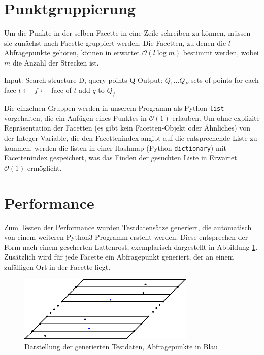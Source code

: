 \documentclass[11pt, a4paper]{article}
\begin{document}
\section{Punktgruppierung}
Um die Punkte in der selben Facette in eine Zeile schreiben zu können, müssen sie zunächst nach Facette gruppiert werden. Die Facetten, zu denen die $l$ Abfragepunkte gehören, können in erwartet $\mathcal{O}(l \log m)$ bestimmt werden, wobei $m$ die Anzahl der Strecken ist.

\begin{algorithmic}[1]
\State Input: Search structure D, query points Q
\State Output: $Q_1 \dots Q_F$ sets of points for each face
		\State $t \gets$ 
		\State $f \gets$ face of $t$
		\State add $q$ to $Q_f$
	\EndFor
\EndFunction
\end{algorithmic}

Die einzelnen Gruppen werden in unserem Programm als Python \texttt{list} vorgehalten, die ein Anfügen eines Punktes in $\mathcal{O}(1)$ erlauben. Um ohne explizite Repräsentation der Facetten (es gibt kein Facetten-Objekt oder Ähnliches) von der Integer-Variable, die den Facettenindex angibt auf die entsprechende Liste zu kommen, werden die listen in einer Hashmap (Python-\texttt{dictionary}) mit Facettenindex gespeichert, was das Finden der gesuchten Liste in Erwartet $\mathcal{O}(1)$ ermöglicht.

\section{Performance}
Zum Testen der Performance wurden Testdatensätze generiert, die automatisch von einem weiteren Python3-Programm erstellt werden. Diese entsprechen der Form nach einem gescherten Lattenrost, exemplarisch dargestellt in Abbildung \ref{fig:generated_dataset}. Zusätzlich wird für jede Facette ein Abfragepunkt generiert, der an einem zufälligen Ort in der Facette liegt.

\begin{figure}[h!]
	\centering
	\includegraphics[width=0.75\textwidth]{generated_dataset}
	\caption{Darstellung der generierten Testdaten, Abfragepunkte in Blau}
	\label{fig:generated_dataset}
\end{figure}
\end{document}
